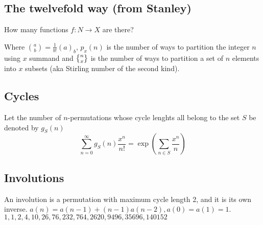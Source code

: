 	

\subsection{The twelvefold way (from Stanley)}
How many functions $f \colon N \rightarrow X$ are there?


  Where $\binom{a}{b} = \frac{1}{b!}(a)_b $, $p_x(n)$ is the number of ways to partition the integer $n$ using $x$ summand and $\stirlingsecond{n}{x}$ is the number of ways to partition a set of $n$ elements into $x$ subsets (aka Stirling number of the second kind).

\subsection{Cycles}
		Let the number of $n$-permutations whose cycle lenghts all belong to the set $S$ be denoted by $g_S (n)$
		\small
		$$\sum_{n=0} ^\infty g_S(n) \frac{x^n}{n!} = \exp\left(\sum_{n\in S} \frac{x^n}{n} \right)$$\normalsize


\subsection{Involutions}
    An involution is a permutation with maximum cycle length 2, and it is its own inverse. 
    $a(n) = a(n-1) + (n-1)a(n-2), a(0) = a(1) = 1$.\\
    $1, 1, 2, 4, 10, 26, 76, 232, 764, 2620, 9496, 35696, 140152$

